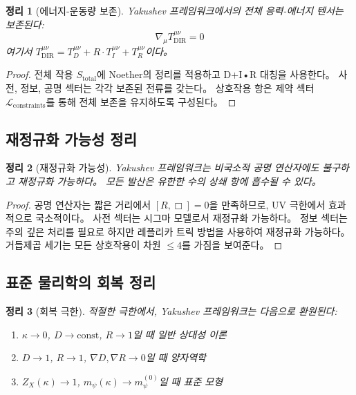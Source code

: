 \documentclass[11pt,a4paper]{article}
\newtheorem{theorem}{정리}
\begin{document}
\begin{theorem}[에너지-운동량 보존]
Yakushev 프레임워크에서의 전체 응력-에너지 텐서는 보존된다:
\begin{equation}
	\boxed{\nabla_\mu T^{\mu\nu}_{\text{DIR}} = 0}
\end{equation}
여기서 $T^{\mu\nu}_{\text{DIR}} = T^{\mu\nu}_D + R \cdot T^{\mu\nu}_I + T^{\mu\nu}_R$이다。
\end{theorem}

\begin{proof}
전체 작용 $S_{\text{total}}$에 Noether의 정리를 적용하고 D+I•R 대칭을 사용한다。 사전, 정보, 공명 섹터는 각각 보존된 전류를 갖는다。 상호작용 항은 제약 섹터 $\mathcal{L}_{\text{constraints}}$를 통해 전체 보존을 유지하도록 구성된다。
\end{proof}

\subsection{재정규화 가능성 정리}

\begin{theorem}[재정규화 가능성]
Yakushev 프레임워크는 비국소적 공명 연산자에도 불구하고 재정규화 가능하다。 모든 발산은 유한한 수의 상쇄 항에 흡수될 수 있다。
\end{theorem}

\begin{proof}
공명 연산자는 짧은 거리에서 $[R, \Box] = 0$을 만족하므로, UV 극한에서 효과적으로 국소적이다。 사전 섹터는 시그마 모델로서 재정규화 가능하다。 정보 섹터는 주의 깊은 처리를 필요로 하지만 레플리카 트릭 방법을 사용하여 재정규화 가능하다。 거듭제곱 세기는 모든 상호작용이 차원 $\leq 4$를 가짐을 보여준다。
\end{proof}

\subsection{표준 물리학의 회복 정리}

\begin{theorem}[회복 극한]
적절한 극한에서, Yakushev 프레임워크는 다음으로 환원된다:
\begin{enumerate}
	\item $\kappa \to 0$, $D \to \text{const}$, $R \to 1$일 때 일반 상대성 이론
	\item $D \to 1$, $R \to 1$, $\nabla D, \nabla R \to 0$일 때 양자역학
	\item $Z_X(\kappa) \to 1$, $m_\psi(\kappa) \to m_\psi^{(0)}$일 때 표준 모형
\end{enumerate}
\end{theorem}
\end{document}
